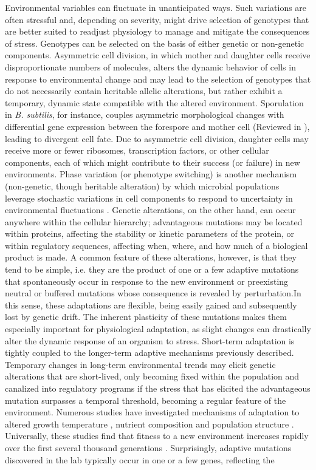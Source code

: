 Environmental variables can fluctuate in unanticipated ways. Such variations are often stressful and, depending on severity, might drive selection of genotypes that are better suited to readjust physiology to manage and mitigate the consequences of stress. Genotypes can be selected on the basis of either genetic or non-genetic components. Asymmetric cell division, in which mother and daughter cells receive disproportionate numbers of molecules, alters the dynamic behavior of cells in response to environmental change and may lead to the selection of genotypes that do not necessarily contain heritable allelic alterations, but rather exhibit a temporary, dynamic state compatible with the altered environment. Sporulation in \textit{B. subtilis}, for instance, couples asymmetric morphological changes with differential gene expression between the forespore and mother cell (Reviewed in \cite{barak_where_2005}), leading to divergent cell fate. Due to asymmetric cell division, daughter cells may receive more or fewer ribosomes, transcription factors, or other cellular components, each of which might  contribute to their success (or failure) in new environments. Phase variation (or phenotype switching) is another mechanism (non-genetic, though heritable alteration) by which microbial populations leverage stochastic variations in cell components to respond to uncertainty in environmental fluctuations \cite{veening_bistability_2008}. Genetic alterations, on the other hand, can occur anywhere within the cellular hierarchy; advantageous mutations may be located within proteins, affecting the stability or kinetic parameters of the protein, or within regulatory sequences, affecting when, where, and how much of a biological product is made. A common feature of these alterations, however, is that they tend to be simple, i.e. they are the product of one or a few adaptive mutations that spontaneously occur in response to the new environment or preexisting neutral or buffered mutations whose consequence is revealed by perturbation.In this sense, these adaptations are flexible, being easily gained and subsequently lost by genetic drift. The inherent plasticity of these mutations makes them especially important for physiological adaptation, as slight changes can drastically alter the dynamic response of an organism to stress. Short-term adaptation is tightly coupled to the longer-term adaptive mechanisms previously described. Temporary changes in long-term environmental trends may elicit genetic alterations that are short-lived, only becoming fixed within the population and canalized into regulatory programs if the stress that has elicited the advantageous mutation surpasses a temporal threshold, becoming a regular feature of the environment. Numerous studies have investigated mechanisms of adaptation to altered growth temperature \cite{bennett_rapid_1990,bennett_experimental_2007}, nutrient composition \cite{cooper_experimental_2010,blount_historical_2008} and population structure \cite{zinser_escherichia_2004}.  Universally, these studies find that fitness to a new environment increases rapidly over the first several thousand generations \cite{lenski_dynamics_1994,barrick_genome_2009}.  Surprisingly, adaptive mutations discovered in the lab typically occur in one or a few genes, reflecting the 